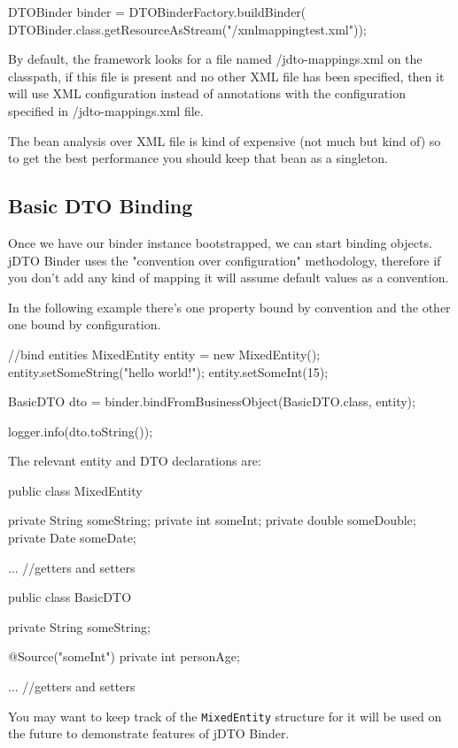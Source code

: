 \documentclass[11pt]{article}
\newcommand{\JDTO}{jDTO Binder\xspace}
\newcommand{\DEFAULTCONFIG}{/jdto-mappings.xml\xspace}
\begin{document}
\begin{java}
DTOBinder binder = DTOBinderFactory.buildBinder(
    DTOBinder.class.getResourceAsStream("/xmlmappingtest.xml"));
\end{java}

By default, the framework looks for a file named \DEFAULTCONFIG on the classpath, if this file is present and no other XML file has been specified, then it will use XML configuration instead of annotations with the configuration specified in \DEFAULTCONFIG file.

The bean analysis over XML file is kind of expensive (not much but kind of) so to get the best performance you should keep that bean as a singleton.

\subsection{Basic DTO Binding}


Once we have our binder instance bootstrapped, we can start binding objects. \JDTO uses the "convention over configuration"
methodology, therefore if you don't add any kind of mapping it will assume default values as a convention. 


In the following example there's one property bound by convention and the other one bound by configuration.


\begin{java}
//bind entities
MixedEntity entity = new MixedEntity();
entity.setSomeString("hello world!");
entity.setSomeInt(15);
        
BasicDTO dto = binder.bindFromBusinessObject(BasicDTO.class, entity);
        
logger.info(dto.toString());
\end{java}

The relevant entity and DTO declarations are:


\begin{java}
 public class MixedEntity {
    private String someString;
    private int someInt;
    private double someDouble;
    private Date someDate;
    
    ... //getters and setters
}

public class BasicDTO {
    private String someString;
    
    @Source("someInt")
    private int personAge;
    
    ... //getters and setters
}
\end{java}

You may want to keep track of the \texttt{MixedEntity} structure for it will be used on the future
to demonstrate features of \JDTO.
\end{document}
